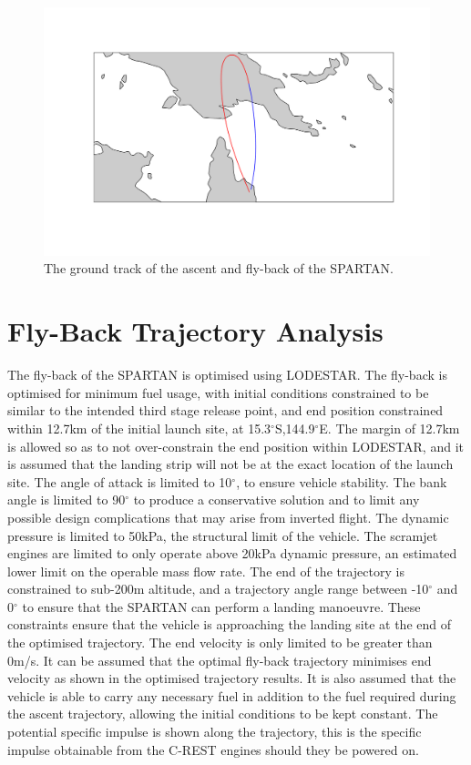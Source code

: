 \begin{figure}[H]
	\centering
	\includegraphics[width=0.7\linewidth]{figures/7_Full/groundtrack}
	\caption{The ground track of the ascent and fly-back of the SPARTAN.}
	\label{fig:groundtrack}
\end{figure}



\section{Fly-Back Trajectory Analysis}
The fly-back of the SPARTAN is optimised using LODESTAR. The fly-back is optimised for minimum fuel usage, with initial conditions constrained to be similar to the intended third stage release point, and end position constrained within 12.7km of the initial launch site, at  15.3$^\circ$S,144.9$^\circ$E\cite{ForbesSpyratos2018}. The margin of 12.7km is allowed so as to not over-constrain the end position within LODESTAR, and it is assumed that the landing strip will not be at the exact location of the launch site. The angle of attack is limited to 10$^\circ$, to ensure vehicle stability. The bank angle is limited to 90$^\circ$ to produce a conservative solution and to limit any possible design complications that may arise from inverted flight. The dynamic pressure is limited to 50kPa, the structural limit of the vehicle. The scramjet engines are limited to only operate above 20kPa dynamic pressure, an estimated lower limit on the operable mass flow rate.
The end of the trajectory is constrained to sub-200m altitude, and a trajectory angle range between -10$^\circ$ and 0$^\circ$ to ensure that the SPARTAN can perform a landing manoeuvre. These constraints ensure that the vehicle is approaching the landing site at the end of the optimised trajectory. The end velocity is only limited to be greater than 0m/s. It can be assumed that the optimal fly-back trajectory minimises end velocity as shown in the optimised trajectory results. 
It is also assumed that the vehicle is able to carry any necessary fuel in addition to the fuel required during the ascent trajectory, allowing the initial conditions to be kept constant. The potential specific impulse is shown along the trajectory, this is the specific impulse obtainable from the C-REST engines should they be powered on.

